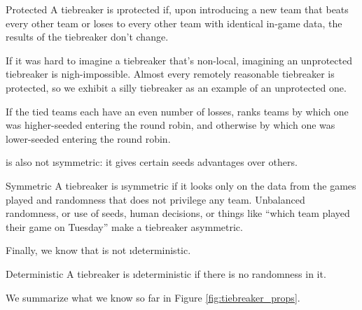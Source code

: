 {    \begin{definition}{Protected}{}
        A tiebreaker is \i{protected} if, upon introducing a new team that beats every other team or loses to every other team with identical in-game data, the results of the tiebreaker don't change.
    \end{definition}

    If it was hard to imagine a tiebreaker that's non-local, imagining an unprotected tiebreaker is nigh-impossible. Almost every remotely reasonable tiebreaker is protected, so we exhibit a silly tiebreaker as an example of an unprotected one.

    \begin{definition}{}{}
        If the tied teams each have an even number of losses,  ranks teams by which one was higher-seeded entering the round robin, and otherwise by which one was lower-seeded entering the round robin.
    \end{definition}

     is also not \i{symmetric}: it gives certain seeds advantages over others.

    \begin{definition}{Symmetric}{}
        A tiebreaker is \i{symmetric} if it looks only on the data from the games played and randomness that does not privilege any team. Unbalanced randomness, or use of seeds, human decisions, or things like ``which team played their game on Tuesday'' make a tiebreaker asymmetric.
    \end{definition}

    Finally, we know that  is not \i{deterministic}.

    \begin{definition}{Deterministic}{}
        A tiebreaker is \i{deterministic} if there is no randomness in it.
    \end{definition}

    We summarize what we know so far in Figure \ref{fig:tiebreaker_props}.

}
